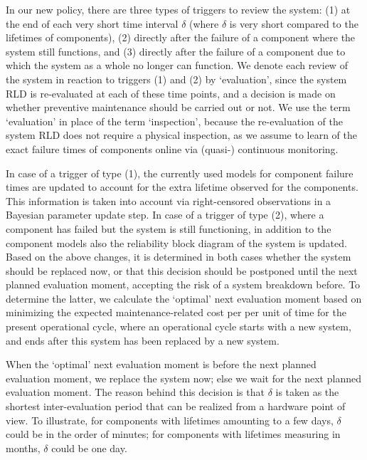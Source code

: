 \documentclass[authoryear]{elsarticle}
\begin{document}
In our new policy, there are three types of triggers to review the system:
(1) at the end of each very short time interval $\delta$ 
(where $\delta$ is very short compared to the lifetimes of components),
(2) directly after the failure of a component where the system still functions,
and (3) directly after the failure of a component due to which the system as a whole no longer can function. 
We denote each review of the system in reaction to triggers (1) and (2) by `evaluation',
since the system RLD is re-evaluated at each of these time points,
and a decision is made on whether preventive maintenance should be carried out or not.
We use the term `evaluation' in place of the term `inspection',
because the re-evaluation of the system RLD does not require a physical inspection,
as we assume to learn of the exact failure times of components online via (quasi-) continuous monitoring.

In case of a trigger of type (1),
the currently used models for component failure times are updated
to account for the extra lifetime observed for the components.
This information is taken into account via right-censored observations
in a Bayesian parameter update step.
In case of a trigger of type (2),
where a component has failed but the system is still functioning,
in addition to the component models also the reliability block diagram of the system is updated.
Based on the above changes,
it is determined in both cases whether the system should be replaced now,
or that this decision should be postponed until the next planned evaluation moment,
accepting the risk of a system breakdown before.
To determine the latter,
we calculate the `optimal' next evaluation moment %
based on minimizing the expected maintenance-related cost per per unit of time for the present operational cycle,
where an operational cycle starts with a new system, and ends after this system has been replaced by a new system. 

When the `optimal' next evaluation moment is before the next planned evaluation moment, we replace the system now;
else we wait for the next planned evaluation moment.
The reason behind this decision is that $\delta$ is taken as %
the shortest inter-evaluation period that can be realized from a hardware point of view. 
To illustrate, for components with lifetimes amounting to a few days,
$\delta$ could be in the order of minutes;
for components with lifetimes measuring in months,
$\delta$ could be one day.
\end{document}
